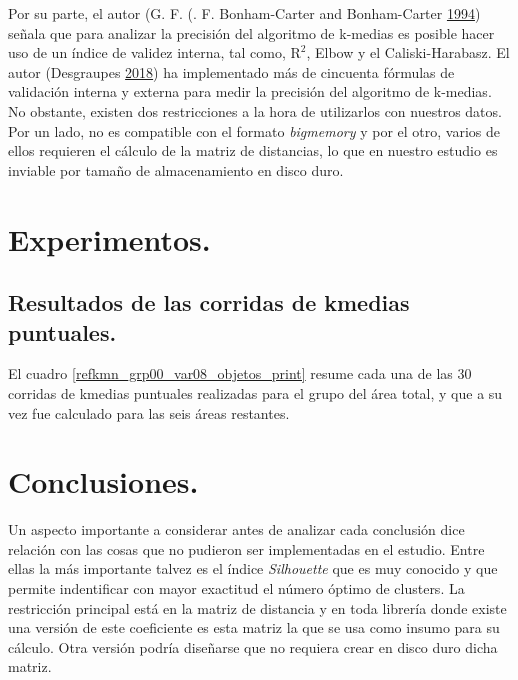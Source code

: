 \documentclass[]{article}
\begin{document}
Por su parte, el autor (G. F. (. F. Bonham-Carter and Bonham-Carter
\protect\hyperlink{ref-bonham-carter_geographic_1994}{1994}) señala que
para analizar la precisión del algoritmo de k-medias es posible hacer
uso de un índice de validez interna, tal como, \(\text{R}^2\), Elbow y
el Caliski-Harabasz. El autor (Desgraupes
\protect\hyperlink{ref-desgraupes_clustercrit_2018}{2018}) ha
implementado más de cincuenta fórmulas de validación interna y externa
para medir la precisión del algoritmo de k-medias. No obstante, existen
dos restricciones a la hora de utilizarlos con nuestros datos. Por un
lado, no es compatible con el formato \emph{bigmemory} y por el otro,
varios de ellos requieren el cálculo de la matriz de distancias, lo que
en nuestro estudio es inviable por tamaño de almacenamiento en disco
duro.

\clearpage

\section{Experimentos.}\label{experimentos.}

\subsection{Resultados de las corridas de kmedias
puntuales.}\label{resultados-de-las-corridas-de-kmedias-puntuales.}

El cuadro \ref{refkmn_grp00_var08_objetos_print} resume cada una de las
30 corridas de kmedias puntuales realizadas para el grupo del área
total, y que a su vez fue calculado para las seis áreas restantes.

\clearpage

\section{Conclusiones.}\label{conclusiones.}

Un aspecto importante a considerar antes de analizar cada conclusión
dice relación con las cosas que no pudieron ser implementadas en el
estudio. Entre ellas la más importante talvez es el índice
\emph{Silhouette} que es muy conocido y que permite indentificar con
mayor exactitud el número óptimo de clusters. La restricción principal
está en la matriz de distancia y en toda librería donde existe una
versión de este coeficiente es esta matriz la que se usa como insumo
para su cálculo. Otra versión podría diseñarse que no requiera crear en
disco duro dicha matriz.
\end{document}
